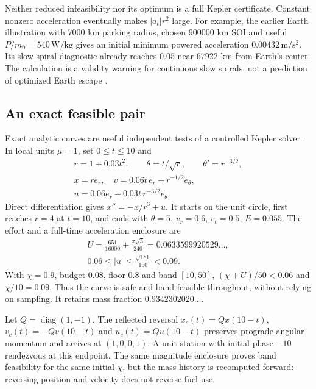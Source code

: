 Neither reduced infeasibility nor its optimum is a full Kepler
certificate. Constant nonzero acceleration eventually makes
$|a_t|r^2$ large. For example, the earlier Earth illustration with
7000 km parking radius, chosen 900000 km SOI and useful
$P/m_0=540\,\mathrm{W/kg}$ gives an initial minimum powered
acceleration $0.00432\,\mathrm{m/s^2}$. Its slow-spiral diagnostic
already reaches $0.05$ near 67922 km from Earth's center.
The calculation is a validity warning for continuous slow spirals,
not a prediction of optimized Earth escape \cite{JPLParameters}.

\subsection{An exact feasible pair}
Exact analytic curves are useful independent tests of a controlled
Kepler solver \cite{PetropoulosSims2002}. In local units $\mu=1$, set
$0\le t\le10$ and
\begin{equation}
 \begin{gathered}
 r=1+0.03t^2,\qquad \theta=t/\sqrt r,\qquad \theta'=r^{-3/2},\\
 x=re_r,\quad v=0.06t\,e_r+r^{-1/2}e_\theta,\\
 u=0.06e_r+0.03t\,r^{-3/2}e_\theta.
 \end{gathered}
 \label{eq:exactescape}
\end{equation}
Direct differentiation gives $x''=-x/r^3+u$. It starts on the unit
circle, first reaches $r=4$ at $t=10$, and ends with
$\theta=5$, $v_r=0.6$, $v_t=0.5$, $E=0.055$.
The effort and a full-time acceleration enclosure are
\begin{equation}
 \begin{gathered}
 U=\frac{651}{16000}+\frac{\pi\sqrt3}{240}
 =0.0633599920529\ldots,\\
 0.06\le|u|\le\frac{\sqrt{181}}{150}<0.09.
 \end{gathered}
\end{equation}
With $\chi=0.9$, budget $0.08$, floor $0.8$ and band $[10,50]$,
$(\chi+U)/50<0.06$ and $\chi/10=0.09$.
Thus the curve is safe and band-feasible throughout, without relying
on sampling. It retains mass fraction $0.9342302020\ldots$.

Let $Q=\operatorname{diag}(1,-1)$. The reflected reversal
$x_c(t)=Qx(10-t)$, $v_c(t)=-Qv(10-t)$ and
$u_c(t)=Qu(10-t)$ preserves prograde angular momentum and arrives
at $(1,0,0,1)$. A unit station with initial phase $-10$ rendezvous
at this endpoint. The same magnitude enclosure proves band feasibility
for the same initial $\chi$, but the mass history is recomputed
forward: reversing position and velocity does not reverse fuel use.

